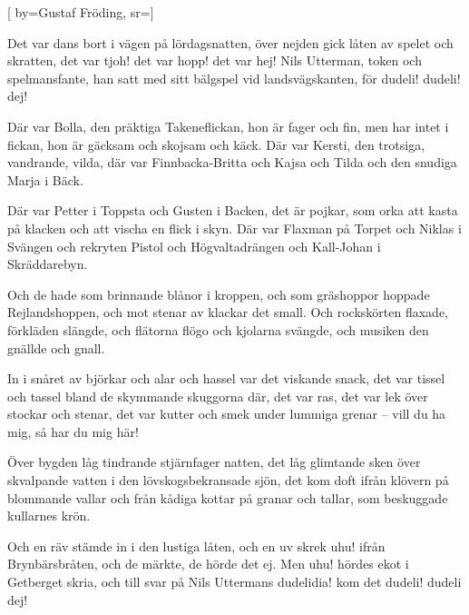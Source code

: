 


[ 	%
	by={Gustaf Fröding},	%
	sr={}]		%
	
\beginverse*		%
Det var dans bort i vägen på lördagsnatten, över
nejden gick låten 
av spelet och skratten,
det var tjoh! det var hopp! det var hej!
Nils Utterman, token och spelmansfante,
han satt med sitt bälgspel vid landsvägskanten,
för dudeli! dudeli! dej! 
\endverse			%

\beginverse*		%
Där var Bolla, den präktiga Takeneflickan,
hon är fager och fin, men har intet i fickan,
hon är gäcksam och skojsam och käck.
Där var Kersti, den trotsiga, vandrande, vilda, där
var Finnbacka-Britta och Kajsa och Tilda
och den snudiga Marja i Bäck.
\endverse			%

\beginverse*		%
Där var Petter i Toppsta
och Gusten i Backen,
det är pojkar, som orka att kasta på klacken
och att vischa en flick i skyn. 
Där var Flaxman på Torpet
och Niklas i Svängen
och rekryten Pistol och Högvaltadrängen
och Kall-Johan i Skräddarebyn. 
\endverse			%

\beginverse*		%
Och de hade som brinnande blånor i kroppen,
och som gräshoppor hoppade Rejlandshoppen,
och mot stenar av klackar det small.
Och rockskörten flaxade, förkläden slängde,
och flätorna flögo och kjolarna svängde,
och musiken den gnällde och gnall. 
\endverse			%

\beginverse*		%
In i snåret av björkar
och alar och hassel
var det viskande snack, det var tissel och tassel
bland de skymmande skuggorna där,
det var ras, det var lek över stockar och stenar,
det var kutter och smek under lummiga grenar
-- vill du ha mig, så har du mig här! 
\endverse			%

\beginverse*		%
Över bygden låg tindrande stjärnfager natten,
det låg glimtande sken över skvalpande vatten
i den lövskogsbekransade sjön,
det kom doft ifrån klövern på blommande vallar
och från kådiga kottar på granar och tallar,
som beskuggade kullarnes krön. 
\endverse			%

\beginverse*		%
Och en räv stämde in i den lustiga låten,
och en uv skrek uhu! ifrån Brynbärsbråten,
och de märkte, de hörde det ej.
Men uhu! hördes ekot i Getberget skria,
och till svar på Nils Uttermans dudelidia!
kom det dudeli! dudeli dej!
\endverse			%
\endsong			%
